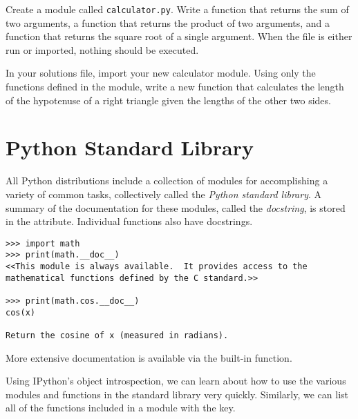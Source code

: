 \begin{problem}
Create a module called \texttt{calculator.py}.
Write a function that returns the sum of two arguments, a function that returns the product of two arguments, and a function that returns the square root of a single argument.
When the file is either run or imported, nothing should be executed.

In your solutions file, import your new calculator module.
Using only the functions defined in the module, write a new function that calculates the length of the hypotenuse of a right triangle given the lengths of the other two sides.
\end{problem}

\section*{Python Standard Library}


All Python distributions include a collection of modules for accomplishing a variety of common tasks, collectively called the \emph{Python standard library}.
A summary of the documentation for these modules, called the \emph{docstring}, is stored in the  attribute.
Individual functions also have docstrings.

\begin{lstlisting}
>>> import math
>>> print(math.__doc__)
<<This module is always available.  It provides access to the
mathematical functions defined by the C standard.>>

>>> print(math.cos.__doc__)
cos(x)

Return the cosine of x (measured in radians).
\end{lstlisting}

More extensive documentation is available via the  built-in function.

Using IPython's object introspection, we can learn about how to use the various modules and functions in the standard library very quickly.
Similarly, we can list all of the functions included in a module with the  key.

